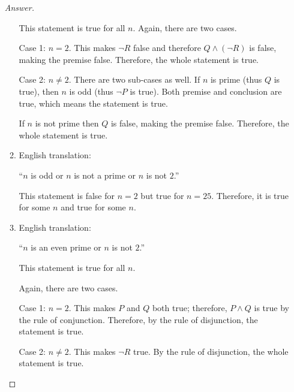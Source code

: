 \documentclass[12pt]{amsart}
\begin{document}
\begin{enumerate}[label=\arabic*.,itemsep=10pt, leftmargin=*]
\begin{proof}[Answer]
\begin{enumerate}
                This statement is true for all $n$.
                Again, there are two cases.

                Case 1: $n=2$. This makes $\neg R$ false and therefore
                $Q \wedge (\neg R)$ is false, making the premise false.
                Therefore, the whole statement is true.

                Case 2: $n\not= 2$. There are two sub-cases as well. 
                If $n$ is prime (thus $Q$ is true), 
                then $n$ is odd (thus $\neg P$ is true).
                Both premise and conclusion are true, which means the statement is true.

                If $n$ is not prime then $Q$ is false, making the premise false.
                Therefore, the whole statement is true.

            \item English translation:

                ``$n$ is odd or $n$ is not a prime or $n$ is not $2$.''

                This statement is false for $n=2$ but true for $n=25$.
                Therefore, it is true for some $n$ and true for some $n$.

            \item English translation:

                ``$n$ is an even prime or $n$ is not $2$.''

                This statement is true for all $n$.

                Again, there are two cases.

                Case 1: $n = 2$. This makes $P$ and  $Q$ both  true; therefore,
                $P \wedge Q$ is true by the rule of conjunction.
                Therefore, by the rule of disjunction, the statement is true.

                Case 2: $n \not = 2$. This makes $\neg R$ true. By the rule
                of disjunction, the whole statement is true.
                
        \end{enumerate}
        
    \end{proof}




\end{enumerate}
\end{document}
